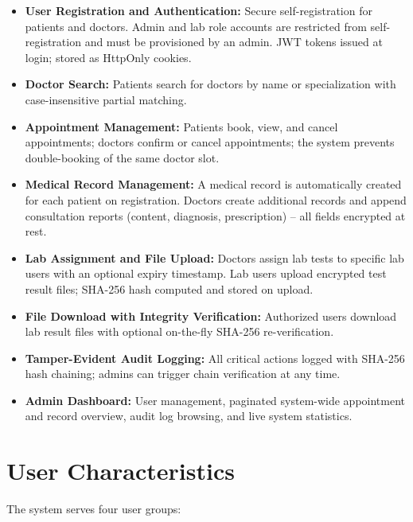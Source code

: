 \documentclass[a4paper,12pt]{report}
\begin{document}
\begin{itemize}
    \item \textbf{User Registration and Authentication:} Secure self-registration for patients and doctors. Admin and lab role accounts are restricted from self-registration and must be provisioned by an admin. JWT tokens issued at login; stored as HttpOnly cookies.
    \item \textbf{Doctor Search:} Patients search for doctors by name or specialization with case-insensitive partial matching.
    \item \textbf{Appointment Management:} Patients book, view, and cancel appointments; doctors confirm or cancel appointments; the system prevents double-booking of the same doctor slot.
    \item \textbf{Medical Record Management:} A medical record is automatically created for each patient on registration. Doctors create additional records and append consultation reports (content, diagnosis, prescription) -- all fields encrypted at rest.
    \item \textbf{Lab Assignment and File Upload:} Doctors assign lab tests to specific lab users with an optional expiry timestamp. Lab users upload encrypted test result files; SHA-256 hash computed and stored on upload.
    \item \textbf{File Download with Integrity Verification:} Authorized users download lab result files with optional on-the-fly SHA-256 re-verification.
    \item \textbf{Tamper-Evident Audit Logging:} All critical actions logged with SHA-256 hash chaining; admins can trigger chain verification at any time.
    \item \textbf{Admin Dashboard:} User management, paginated system-wide appointment and record overview, audit log browsing, and live system statistics.
\end{itemize}

\section{User Characteristics}

The system serves four user groups:
\end{document}
